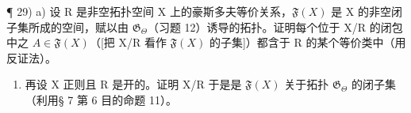 ¶ 29) a) 设 R 是非空拓扑空间 X 上的豪斯多夫等价关系，\(\mathfrak{F}(X)\) 是 X 的非空闭子集所成的空间，赋以由 \(\mathfrak{G}_{\Theta}\)（习题 12）诱导的拓扑。证明每个位于 X/R 的闭包中之 \(A \in \mathfrak{F}(X)\)（{[}把 X/R 看作 \(\mathfrak{F}(X)\) 的子集{]}）都含于 R 的某个等价类中（用反证法）。

\begin{enumerate}
\def\labelenumi{\alph{enumi})}
\setcounter{enumi}{1}
\tightlist
\item
  再设 X 正则且 R 是开的。证明 X/R 于是是 \(\mathfrak{F}(X)\) 关于拓扑 \(\mathfrak{G}_{\Theta}\) 的闭子集（利用§ 7 第 6 目的命题 11）。
\end{enumerate}

